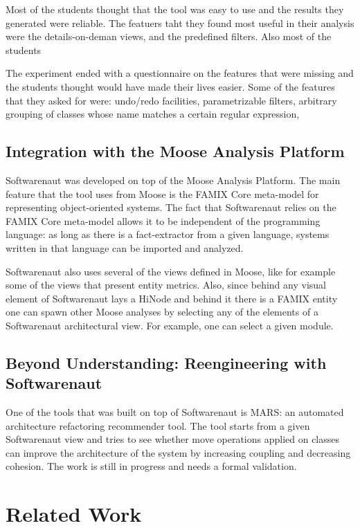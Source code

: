 \documentclass[preprint,12pt]{elsarticle}
\begin{document}
Most of the students thought that the tool was easy to use and the results they generated were reliable. The featuers taht they found most useful in their analysis were the details-on-deman views, and the predefined filters. Also most of the students 

The experiment ended with a questionnaire on the features that were missing and the students thought would have made their lives easier. Some of the features that they asked for were: undo/redo facilities, parametrizable filters, arbitrary grouping of classes whose name matches a certain regular expression, 

\subsection {Integration with the Moose Analysis Platform}
Softwarenaut was developed on top of the Moose Analysis Platform. The main feature that the tool uses from Moose is the FAMIX Core meta-model for representing object-oriented systems. The fact that Softwarenaut relies on the FAMIX Core meta-model allows it to be independent of the programming language: as long as there is a fact-extractor from a given language, systems written in that language can be imported and analyzed. 

Softwarenaut also uses several of the views defined in Moose, like for example some of the views that present entity metrics. Also, since behind any visual element of Softwarenaut lays a HiNode and behind it there is a FAMIX entity one can spawn other Moose analyses by selecting any of the elements of a Softwarenaut architectural view. For example, one can select a given module.


\subsection {Beyond Understanding: Reengineering with Softwarenaut}
One of the tools that was built on top of Softwarenaut is MARS: an automated architecture refactoring recommender tool. The tool starts from a given Softwarenaut view and tries to see whether move operations applied on classes can improve the architecture of the system by increasing coupling and decreasing cohesion. The work is still in progress and needs a formal validation. 


\section {Related Work}
\label {sec:rel}
\end{document}
